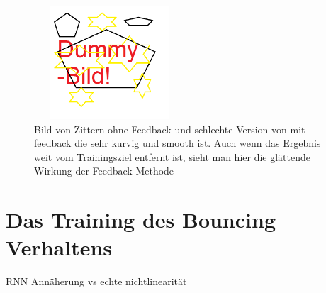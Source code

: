 \begin{figure}
	\centering
	\includegraphics[width=0.5\textwidth, height=160px]{pics/dummy.png}	
	\caption{Bild von Zittern ohne Feedback und schlechte Version von mit feedback die sehr kurvig und smooth ist. Auch wenn das Ergebnis weit vom Trainingsziel entfernt ist, sieht man hier die glättende Wirkung der Feedback Methode }
	\label{img:fb}
\end{figure}
\section{Das Training des Bouncing Verhaltens}




RNN Annäherung vs echte nichtlinearität
